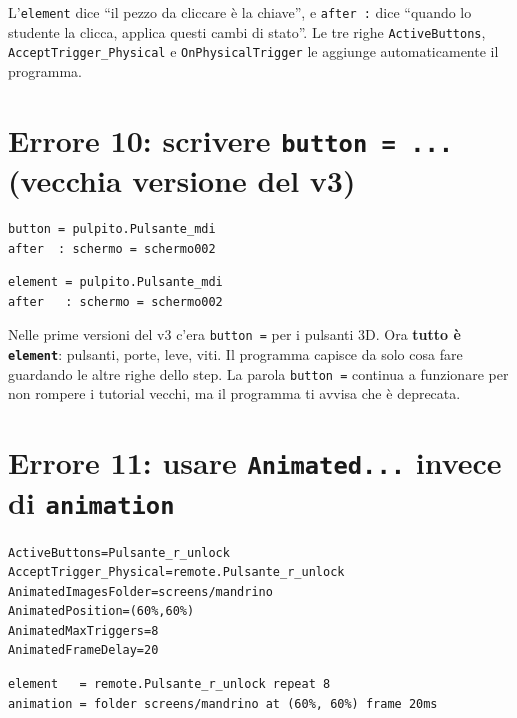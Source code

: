 ﻿\documentclass[a4paper,12pt,oneside]{book}
\newcommand{\kw}[1]{\texttt{\color{keycolor}#1}}
\begin{document}
L'\kw{element} dice ``il pezzo da cliccare è la chiave'', e \kw{after :} dice
``quando lo studente la clicca, applica questi cambi di stato''. Le tre righe
\texttt{ActiveButtons}, \texttt{AcceptTrigger\_Physical} e
\texttt{OnPhysicalTrigger} le aggiunge automaticamente il programma.

\section{Errore 10: scrivere \texttt{button = ...} (vecchia versione del v3)}

\begin{sbagliato}
\begin{lstlisting}
button = pulpito.Pulsante_mdi
after  : schermo = schermo002
\end{lstlisting}
\end{sbagliato}

\begin{giusto}
\begin{lstlisting}
element = pulpito.Pulsante_mdi
after   : schermo = schermo002
\end{lstlisting}
\end{giusto}

Nelle prime versioni del v3 c'era \kw{button =} per i pulsanti 3D. Ora
\textbf{tutto è \kw{element}}: pulsanti, porte, leve, viti. Il programma
capisce da solo cosa fare guardando le altre righe dello step. La parola
\kw{button =} continua a funzionare per non rompere i tutorial vecchi, ma il
programma ti avvisa che è deprecata.

\section{Errore 11: usare \texttt{Animated...} invece di \texttt{animation}}

\begin{sbagliato}
\begin{lstlisting}
ActiveButtons=Pulsante_r_unlock
AcceptTrigger_Physical=remote.Pulsante_r_unlock
AnimatedImagesFolder=screens/mandrino
AnimatedPosition=(60%,60%)
AnimatedMaxTriggers=8
AnimatedFrameDelay=20
\end{lstlisting}
\end{sbagliato}

\begin{giusto}
\begin{lstlisting}
element   = remote.Pulsante_r_unlock repeat 8
animation = folder screens/mandrino at (60%, 60%) frame 20ms
\end{lstlisting}
\end{giusto}
\end{document}
